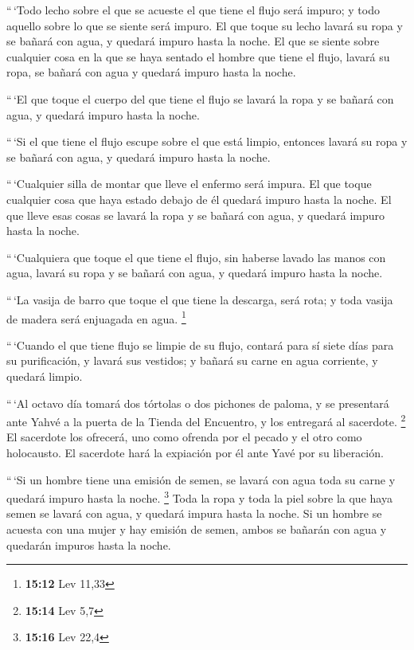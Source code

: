  ``\,`Todo lecho sobre el que se acueste el que tiene el
flujo será impuro; y todo aquello sobre lo que se siente será impuro.
 El que toque su lecho lavará su ropa y se bañará con
agua, y quedará impuro hasta la noche.  El que se siente
sobre cualquier cosa en la que se haya sentado el hombre que tiene el
flujo, lavará su ropa, se bañará con agua y quedará impuro hasta la
noche.

 ``\,`El que toque el cuerpo del que tiene el flujo se
lavará la ropa y se bañará con agua, y quedará impuro hasta la noche.

 ``\,`Si el que tiene el flujo escupe sobre el que está
limpio, entonces lavará su ropa y se bañará con agua, y quedará impuro
hasta la noche.

 ``\,`Cualquier silla de montar que lleve el enfermo será
impura.  El que toque cualquier cosa que haya estado
debajo de él quedará impuro hasta la noche. El que lleve esas cosas se
lavará la ropa y se bañará con agua, y quedará impuro hasta la noche.

 ``\,`Cualquiera que toque el que tiene el flujo, sin
haberse lavado las manos con agua, lavará su ropa y se bañará con agua,
y quedará impuro hasta la noche.

 ``\,`La vasija de barro que toque el que tiene la
descarga, será rota; y toda vasija de madera será enjuagada en agua.
\footnote{\textbf{15:12} Lev 11,33}

 ``\,`Cuando el que tiene flujo se limpie de su flujo,
contará para sí siete días para su purificación, y lavará sus vestidos;
y bañará su carne en agua corriente, y quedará limpio.

 ``\,`Al octavo día tomará dos tórtolas o dos pichones de
paloma, y se presentará ante Yahvé a la puerta de la Tienda del
Encuentro, y los entregará al sacerdote. \footnote{\textbf{15:14} Lev
  5,7}  El sacerdote los ofrecerá, uno como ofrenda por
el pecado y el otro como holocausto. El sacerdote hará la expiación por
él ante Yavé por su liberación.

 ``\,`Si un hombre tiene una emisión de semen, se lavará
con agua toda su carne y quedará impuro hasta la noche. \footnote{\textbf{15:16}
  Lev 22,4}  Toda la ropa y toda la piel sobre la que
haya semen se lavará con agua, y quedará impura hasta la noche.
 Si un hombre se acuesta con una mujer y hay emisión de
semen, ambos se bañarán con agua y quedarán impuros hasta la noche.

